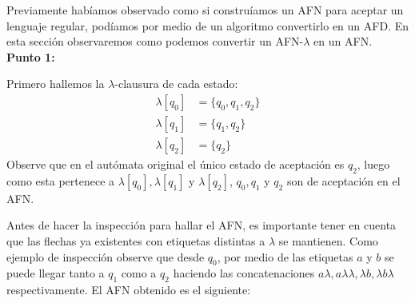 
Previamente habíamos observado como si construíamos un AFN para aceptar un lenguaje regular, podíamos por medio de un algoritmo convertirlo en un AFD. En esta sección observaremos como podemos convertir un AFN-$\lambda$ en un AFN.\\

\textbf{Punto 1: }\hfill
\begin{center}
\end{center}
Primero hallemos la $\lambda$-clausura de cada estado:
\begin{align*}
    \lambda[q_0]&=\{q_0,q_1,q_2\}\\
    \lambda[q_1]&=\{q_1,q_2\}\\
    \lambda[q_2]&=\{q_2\}
\end{align*}
Observe que en el autómata original el único estado de aceptación es $q_2$, luego como esta pertenece a $\lambda[q_0],\lambda[q_1]$ y $\lambda[q_2]$, $q_0,q_1$ y $q_2$ son de aceptación en el AFN.
\begin{basedtikz}
\centering
\end{basedtikz}
Antes de hacer la inspección para hallar el AFN, es importante tener en cuenta que las flechas ya existentes con etiquetas distintas a $\lambda$ se mantienen. Como ejemplo de inspección observe que desde $q_0$, por medio de las etiquetas $a$ y $b$ se puede llegar tanto a $q_1$ como a $q_2$ haciendo las concatenaciones $a\lambda,a\lambda\lambda,\lambda b,\lambda b\lambda$ respectivamente. El AFN obtenido es el siguiente:
